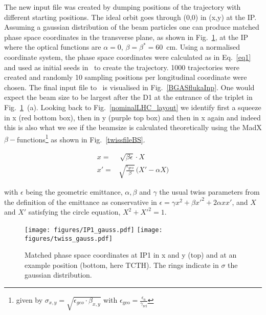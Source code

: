 The new input file was created by dumping positions of the trajectory with different starting positions. The ideal orbit goes through (0,0) in (x,y) at the IP. Assuming a gaussian distribution of the beam particles one can produce matched phase space coordinates in the transverse plane, as shown in Fig.~\ref{ip1_gauss}, at the IP where the optical functions are $\alpha = 0$, $\beta = \beta^* = 60$~cm. Using a normalised coordinate system, the phase space coordinates were calculated as in Eq.~\ref{eq1} and used as initial seeds in \fluka~to create the trajectory. 1000 trajectories were created and randomly 10 sampling positions per longitudinal coordinate were chosen. The final input file to \fluka~is visualised in Fig.~\ref{BGASflukaInp}. One would expect the beam size to be largest after the D1 at the entrance of the triplet in Fig.~\ref{ip1_gauss}~(a). Looking back to Fig.~\ref{nominalLHC_layout} we identify first a squeeze in x (red bottom box), then in y (purple top box) and then in x again and indeed this is also what we see if the beamsize is calculated theoretically using the MadX $\beta-$functions\footnote{given by $\sigma_{x,y} = \sqrt{\epsilon_{geo} \cdot \beta_{x,y}}$ with $\epsilon_{\textrm{geo}} = \frac{ \epsilon_{\textrm{n}}}{\gamma_{\textrm{rel}}}$} as shown in Fig.~\ref{twissfileBS}.

\begin{equation} \label{eq1}
  \begin{split}
x = & \, \sqrt{\beta \epsilon} \cdot X \\
x' = & \sqrt{\frac{\epsilon_{geo}}{\beta}} \, \big( X' - \alpha X \big)
  \end{split}
\end{equation}

with $\epsilon$ being the geometric emittance, $\alpha, \beta$ and $\gamma$ the usual twiss parameters from the definition of the emittance as conservative in $\epsilon = \gamma x^2 + \beta x'^2 + 2 \alpha x x'$, and $X$ and $X'$ satisfying the circle equation, $X^2 + X'^2 = 1$. 


\begin{figure}%
\begin{center}
\texttt{[image: figures/IP1\_gauss.pdf]}
\texttt{[image: figures/twiss\_gauss.pdf]}
\end{center}
\vspace{-0.6cm}
 \caption{Matched phase space coordinates at IP1 in x and y (top) and at an example position (bottom, here TCTH). The rings indicate in $\sigma$ the gaussian distribution.
  \label{ip1_gauss}}
\end{figure}


